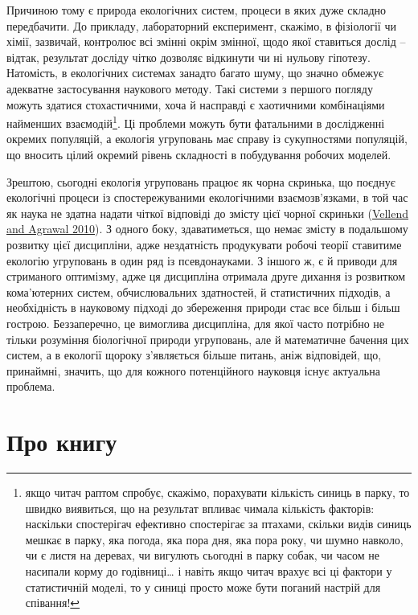 \documentclass[
  11pt,
]{book}
\begin{document}
Причиною тому є природа екологічних систем, процеси в яких дуже складно
передбачити. До прикладу, лабораторний експеримент, скажімо, в
фізіології чи хімії, зазвичай, контролює всі змінні окрім змінної, щодо
якої ставиться дослід -- відтак, результат досліду чітко дозволяє
відкинути чи ні нульову гіпотезу. Натомість, в екологічних системах
занадто багато шуму, що значно обмежує адекватне застосування наукового
методу. Такі системи з першого погляду можуть здатися стохастичними,
хоча й насправді є хаотичними комбінаціями найменших
взаємодій\footnote{якщо читач раптом спробує, скажімо, порахувати
  кількість синиць в парку, то швидко виявиться, що на результат впливає
  чимала кількість факторів: наскільки спостерігач ефективно спостерігає
  за птахами, скільки видів синиць мешкає в парку, яка погода, яка пора
  дня, яка пора року, чи шумно навколо, чи є листя на деревах, чи
  вигулють сьогодні в парку собак, чи часом не насипали корму до
  годівниці\ldots{} і навіть якщо читач врахує всі ці фактори у
  статистичній моделі, то у синиці просто може бути поганий настрій для
  співання!}. Ці проблеми можуть бути фатальними в дослідженні окремих
популяцій, а екологія угруповань має справу із сукупностями популяцій,
що вносить цілий окремий рівень складності в побудування робочих
моделей.

Зрештою, сьогодні екологія угруповань працює як чорна скринька, що
поєднує екологічні процеси із спостережуваними екологічними
взаємозв'язками, в той час як наука не здатна надати чіткої відповіді до
змісту цієї чорної скриньки
(\href{https://doi.org/10.1086/652373}{Vellend and Agrawal 2010}). З
одного боку, здаватиметься, що немає змісту в подальшому розвитку цієї
дисципліни, адже нездатність продукувати робочі теорії ставитиме
екологію угруповань в один ряд із псевдонауками. З іншого ж, є й приводи
для стриманого оптимізму, адже ця дисципліна отримала друге дихання із
розвитком кома'ютерних систем, обчислювальних здатностей, й статистичних
підходів, а необхідність в науковому підході до збереження природи стає
все більш і більш гострою. Беззаперечно, це вимоглива дисципліна, для
якої часто потрібно не тільки розуміння біологічної природи угруповань,
але й математичне бачення цих систем, а в екології щороку з'являється
більше питань, аніж відповідей, що, принаймні, значить, що для кожного
потенційного науковця існує актуальна проблема.

\chapter{Про книгу}\label{about-book}
\end{document}
